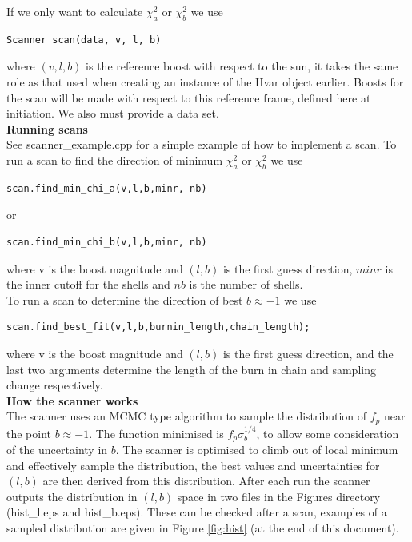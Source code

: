 \documentclass[11pt]{article}
\begin{document}
If we only want to calculate $\chi^2_a$ or $\chi^2_b$ we use
\begin{verbatim}
Scanner scan(data, v, l, b)
\end{verbatim}
where $(v,l,b)$ is the reference boost with respect to the sun, it takes the same role as that used when creating an instance of the Hvar object earlier.  Boosts for the scan will be made with respect to this reference frame, defined here at initiation.  We also must provide a data set.\\

\textbf{Running scans}\\

See scanner\_example.cpp for a simple example of how to implement a scan.  To run a scan to find the direction of minimum $\chi^2_a$ or $\chi^2_b$ we use
\begin{verbatim}
scan.find_min_chi_a(v,l,b,minr, nb)
\end{verbatim}
or
\begin{verbatim}
scan.find_min_chi_b(v,l,b,minr, nb)
\end{verbatim}
where v is the boost magnitude and $(l,b)$ is the first guess direction, $minr$ is the inner cutoff for the shells and $nb$ is the number of shells.\\

To run a scan to determine the direction of best $b\approx -1$ we use
\begin{verbatim}
scan.find_best_fit(v,l,b,burnin_length,chain_length);
\end{verbatim}
where v is the boost magnitude and $(l,b)$ is the first guess direction, and the last two arguments determine the length of the burn in chain and sampling change respectively.\\

\textbf{How the scanner works}\\

The scanner uses an MCMC type algorithm to sample the distribution of $f_p$ near the point $b\approx -1$.  The function minimised is $f_p\sigma_b^{1/4}$, to allow some consideration of the uncertainty in $b$.  The scanner is optimised to climb out of local minimum and effectively sample the distribution, the best values and uncertainties for $(l,b)$ are then derived from this distribution.  After each run the scanner outputs the distribution in $(l,b)$ space in two files in the Figures directory (hist\_l.eps and hist\_b.eps).  These can be checked after a scan, examples of a sampled distribution are given in Figure \ref{fig:hist} (at the end of this document).\\
\end{document}
